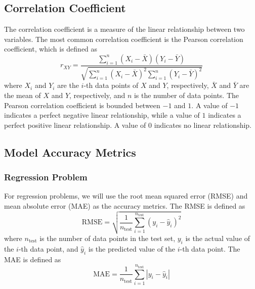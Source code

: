 \documentclass[conf]{new-aiaa}
\begin{document}
\subsection{Correlation Coefficient}
The correlation coefficient is a measure of the linear relationship between two variables. The most common correlation coefficient is the Pearson correlation coefficient, which is defined as
\begin{equation} \label{eq:pearsoncorr}
    r_{XY} = \frac{\sum_{i=1}^n \left(X_i - \bar{X}\right)\left(Y_i - \bar{Y}\right)}{\sqrt{\sum_{i=1}^n \left(X_i - \bar{X}\right)^2 \sum_{i=1}^n \left(Y_i - \bar{Y}\right)^2}}
\end{equation}
where $X_i$ and $Y_i$ are the $i$-th data points of $X$ and $Y$, respectively, $\bar{X}$ and $\bar{Y}$ are the mean of $X$ and $Y$, respectively, and $n$ is the number of data points. The Pearson correlation coefficient is bounded between $-1$ and $1$. A value of $-1$ indicates a perfect negative linear relationship, while a value of $1$ indicates a perfect positive linear relationship. A value of $0$ indicates no linear relationship.

\subsection{Model Accuracy Metrics}
\subsubsection{Regression Problem}
For regression problems, we will use the root mean squared error (RMSE) and mean absolute error (MAE) as the accuracy metrics. The RMSE is defined as
\begin{equation} \label{eq:rmse}
    \textrm{RMSE} = \sqrt{\frac{1}{n_\textrm{test}} \sum_{i=1}^{n_\textrm{test}} \left(y_i - \hat{y}_i\right)^2}
\end{equation}
where $n_\textrm{test}$ is the number of data points in the test set, $y_i$ is the actual value of the $i$-th data point, and $\hat{y}_i$ is the predicted value of the $i$-th data point. The MAE is defined as
\begin{equation} \label{eq:mae}
    \textrm{MAE} = \frac{1}{n_\textrm{test}} \sum_{i=1}^{n_\textrm{test}} \left|y_i - \hat{y}_i\right|
\end{equation}
\end{document}

